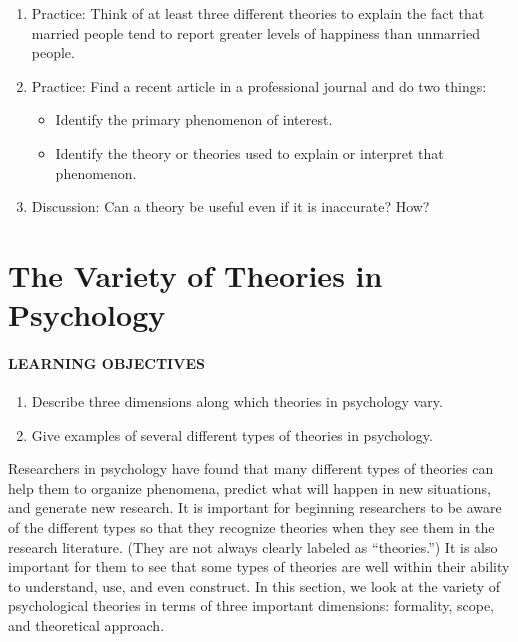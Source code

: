 \documentclass[
]{krantz}
\providecommand{\tightlist}{%
  \setlength{\itemsep}{0pt}\setlength{\parskip}{0pt}}
\begin{document}
\begin{enumerate}
\def\labelenumi{\arabic{enumi}.}
\tightlist
\item
  Practice: Think of at least three different theories to explain the fact that married people tend to report greater levels of happiness than unmarried people.
\item
  Practice: Find a recent article in a professional journal and do two things:

  \begin{itemize}
  \tightlist
  \item
    Identify the primary phenomenon of interest.
  \item
    Identify the theory or theories used to explain or interpret that phenomenon.
  \end{itemize}
\item
  Discussion: Can a theory be useful even if it is inaccurate? How?
\end{enumerate}

\section{The Variety of Theories in Psychology}\label{the-variety-of-theories-in-psychology}

\paragraph*{LEARNING OBJECTIVES}\label{learning-objectives-28}

\begin{enumerate}
\def\labelenumi{\arabic{enumi}.}
\tightlist
\item
  Describe three dimensions along which theories in psychology vary.
\item
  Give examples of several different types of theories in psychology.
\end{enumerate}

Researchers in psychology have found that many different types of theories can help them to organize phenomena, predict what will happen in new situations, and generate new research. It is important for beginning researchers to be aware of the different types so that they recognize theories when they see them in the research literature. (They are not always clearly labeled as ``theories.'') It is also important for them to see that some types of theories are well within their ability to understand, use, and even construct. In this section, we look at the variety of psychological theories in terms of three important dimensions: formality, scope, and theoretical approach.
\end{document}
